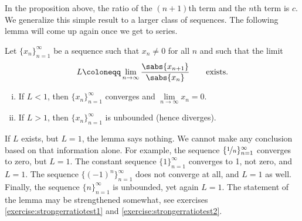 In the proposition above, the
ratio of the $(n+1)$th term and the $n$th term is $c$.  We 
generalize this simple result to a larger class of sequences.
The following lemma will come up again once we get to series.

\begin{lemma}
\label{seq:ratiotest}
Let $\{ x_n \}_{n=1}^\infty$ be a sequence such that $x_n \not= 0$ for all $n$ and such that
the limit
\begin{equation*}
L \coloneqq \lim_{n\to\infty} \frac{\sabs{x_{n+1}}}{\sabs{x_n}}
\qquad
\text{exists.}
\end{equation*}
\begin{enumerate}[(i)]
\item
If $L < 1$, then $\{ x_n \}_{n=1}^\infty$ converges and $\lim\limits_{n\to\infty} x_n = 0$.
\item
If $L > 1$, then $\{ x_n \}_{n=1}^\infty$ is unbounded (hence diverges).
\end{enumerate}
\end{lemma}

If $L$ exists, but $L=1$, the lemma says nothing.  We cannot make any
conclusion based on that information alone.  For example,
the sequence $\{ \nicefrac{1}{n} \}_{n=1}^\infty$ converges to zero, but $L=1$.
The constant sequence $\{ 1 \}_{n=1}^\infty$ converges to 1, not zero, and 
$L=1$.  The sequence $\bigl\{ {(-1)}^n \bigr\}_{n=1}^\infty$ does not converge at all, and $L=1$ as
well.
Finally, the sequence $\{  n \}_{n=1}^\infty$ is unbounded, yet again $L=1$.
The statement of the lemma may be strengthened somewhat, see 
exercises \ref{exercise:strongerratiotest1} and
\ref{exercise:strongerratiotest2}.


